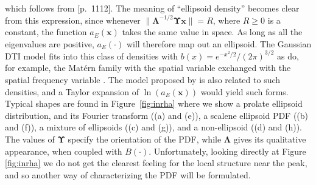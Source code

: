 \documentclass[dvips,aoas,preprint]{imsart}
\numberwithin{equation}{section}
\theoremstyle{plain}
\newcommand{\x}{\mathbf{x}}
\newcommand{\bs}[1]{\boldsymbol{#1}}
\begin{document}
which follows from \citep{grad}[p.~1112].  The meaning of ``ellipsoid
density'' becomes clear from this expression, since whenever
$\|\bs{\Lambda}^{-1/2}\bs{\Upsilon}\x\|=R$, where $R\ge 0$ is a
constant, the function $a_E(\x)$ takes the same value in space.  As
long as all the eigenvalues are positive, $ a_E(\cdot)$ will therefore
map out an ellipsoid.  The Gaussian DTI model fits into this class of
densities with $b(x)=e^{-x^2/2}/(2\pi)^{3/2}$ as do, for example, the
Mat\'ern family with the spatial variable exchanged with the spatial
frequency variable \citep{Matern}.  The model proposed by
\citet{Kaden2007} is also related to such densities, and a Taylor
expansion of $\ln(a_E(\x))$ would yield such forms. Typical shapes are
found in Figure~\ref{fig:inrha} where we show a prolate ellipsoid
distribution, and its Fourier transform ((a) and (e)), a scalene
ellipsoid PDF ((b) and (f)), a mixture of ellipsoids ((c) and (g)),
and a non-ellipsoid ((d) and (h)). The values of $\bm{\Upsilon}$
specify the orientation of the PDF, while $\bm{\Lambda}$ gives its
qualitative appearance, when coupled with $B(\cdot)$. Unfortunately,
looking directly at Figure \ref{fig:inrha} we do not get the clearest
feeling for the local structure near the peak, and so another way of
characterizing the PDF will be formulated.
\end{document}
